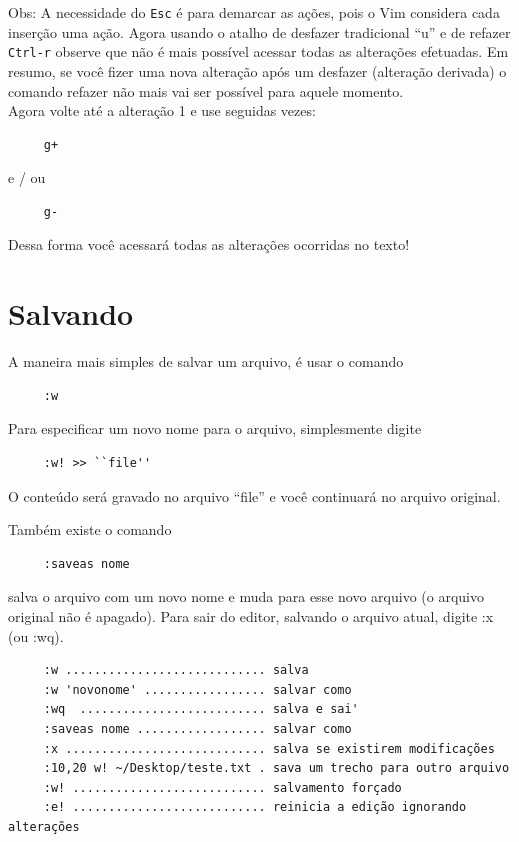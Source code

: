 \documentclass[10pt,a4paper,openany]{book}
\begin{document}
Obs: A necessidade do {\tt Esc} é para demarcar as ações, pois o Vim
considera cada inserção uma ação.  Agora usando o atalho de desfazer
tradicional ``u'' e de refazer {\tt Ctrl-r} observe que não é mais possível
acessar todas as alterações efetuadas. Em resumo, se você fizer uma
nova alteração após um desfazer (alteração derivada) o comando refazer
não mais vai ser possível para aquele momento. \\

Agora volte até a alteração 1 e use seguidas vezes:

\begin{verbatim}
     g+
\end{verbatim}

e / ou

\begin{verbatim}
     g-
\end{verbatim}

Dessa forma você acessará todas as alterações ocorridas no texto!

\section{Salvando}

A maneira mais simples de salvar um arquivo, é usar o comando

\begin{verbatim}
     :w
\end{verbatim}


Para especificar um novo nome para o arquivo, simplesmente digite

\begin{verbatim}
     :w! >> ``file''
\end{verbatim}

O conteúdo será gravado no arquivo ``file'' e você continuará no arquivo original.

Também existe o comando

\begin{verbatim}
     :saveas nome
\end{verbatim}

salva o arquivo com um novo nome e muda para esse novo arquivo (o arquivo original não é apagado).
Para sair do editor, salvando o arquivo atual, digite :x (ou :wq).

\begin{verbatim}
     :w ............................ salva
     :w 'novonome' ................. salvar como
     :wq  .......................... salva e sai'
     :saveas nome .................. salvar como
     :x ............................ salva se existirem modificações
     :10,20 w! ~/Desktop/teste.txt . sava um trecho para outro arquivo
     :w! ........................... salvamento forçado
     :e! ........................... reinicia a edição ignorando alterações
\end{verbatim}
\end{document}
